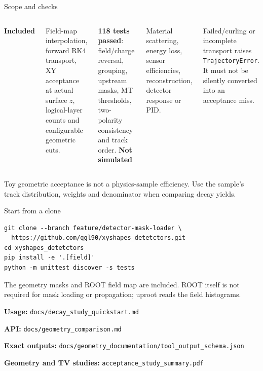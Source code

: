 \documentclass[aspectratio=169,11pt]{beamer}
\begin{document}
\begin{frame}{Scope and checks}
\begin{columns}[T,onlytextwidth]
\textbf{Included}\par\vspace{2mm}
Field-map interpolation, forward RK4 transport, XY acceptance at actual
surface $z$, logical-layer counts and configurable geometric cuts.\par\vspace{3mm}
\textbf{118 tests passed}: field/charge reversal, grouping, upstream masks,
MT thresholds, two-polarity consistency and track order.
\textbf{Not simulated}\par\vspace{2mm}
Material scattering, energy loss, sensor efficiencies, reconstruction,
detector response or PID.\par\vspace{3mm}
Failed/curling or incomplete transport raises \texttt{TrajectoryError}.
It must not be silently converted into an acceptance miss.
\end{columns}
\vspace{4mm}
Toy geometric acceptance is not a physics-sample efficiency. Use the sample's
track distribution, weights and denominator when comparing decay yields.
\end{frame}

\begin{frame}[fragile]{Start from a clone}
\small
\begin{verbatim}
git clone --branch feature/detector-mask-loader \
  https://github.com/qgl90/xyshapes_detetctors.git
cd xyshapes_detetctors
pip install -e '.[field]'
python -m unittest discover -s tests
\end{verbatim}
\normalsize The geometry masks and ROOT field map are included. ROOT itself
is not required for mask loading or propagation; uproot reads the field histograms.\par
\vspace{4mm}
\textbf{Usage:} \texttt{docs/decay\_study\_quickstart.md}\par
\textbf{API:} \texttt{docs/geometry\_comparison.md}\par
\textbf{Exact outputs:} \texttt{docs/geometry\_documentation/tool\_output\_schema.json}\par
\textbf{Geometry and TV studies:} \texttt{acceptance\_study\_summary.pdf}
\end{frame}
\end{document}
